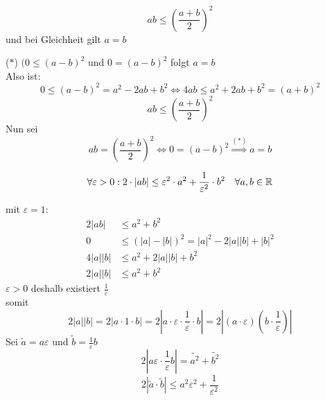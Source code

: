 \documentclass[../ana1u.tex]{subfiles}
\begin{document}
\begin{kor}
    \[ab \leq \left(\frac{a+b}{2}\right)^2\]
    und bei Gleichheit gilt \(a = b\)
\end{kor}
\begin{bew}
    (\(\ast\)) \((0 \leq (a-b)^2\) und \(0 = (a-b)^2\) folgt \(a = b\)\\
    Also ist:
    \[0 \leq (a-b)^2 = a^2 - 2ab + b^2 \Leftrightarrow 4ab \leq a^2 +2ab + b^2 = (a+b)^2\]
    \[ab \leq \left(\frac{a+b}{2}\right)^2\]
    Nun sei
    \[ab = \left(\frac{a+b}{2}\right)^2 \Leftrightarrow 0 = (a-b)^2 \overset{(\ast)}{\Rightarrow} a = b\]
\end{bew}
\begin{satz}
    \[\forall \varepsilon > 0: 2 \cdot |ab| \leq \varepsilon^2 \cdot a^2 + \frac{1}{\varepsilon^2} \cdot b^2 \quad \forall a,b \in \mathbb{R}\]
\end{satz}
\begin{bew}
    mit \(\varepsilon = 1\):\\
    \begin{align*}
        2|ab| &\leq a^2 + b^2\\
        0 &\leq (|a| - |b|)^2 = |a|^2 - 2|a||b| + |b|^2\\
        4|a||b| &\leq a^2 + 2|a||b| + b^2\\
        2|a||b| &\leq a^2 + b^2
    \end{align*}
    \(\varepsilon > 0\) deshalb existiert \(\frac{1}{\varepsilon}\)\\
    somit 
    \[2|a||b| = 2|a \cdot 1 \cdot b| = 2|a \cdot \varepsilon \cdot \frac{1}{\varepsilon} \cdot b| = 2|(a \cdot \varepsilon)(b \cdot \frac{1}{\varepsilon})|\]
    Sei \(\tilde{a} = a\varepsilon\) und \(\tilde{b} = \frac{1}{\varepsilon}b\)
    \[2\left|a\varepsilon \cdot \frac{1}{\varepsilon}b\right| = \tilde{a^2} + \tilde{b^2}\]
    \[2|\tilde{a} \cdot \tilde{b}| \leq a^2\varepsilon^2 + \frac{1}{\varepsilon^2}\] 
\end{bew}
\end{document}
